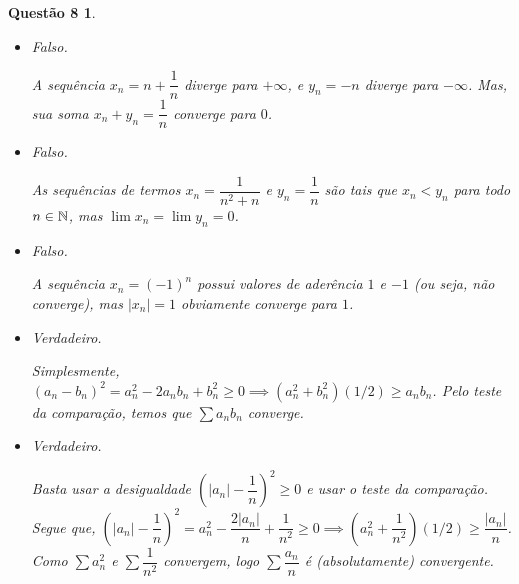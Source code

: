 \documentclass[a4paper,12pt]{article}
\newtheorem*{8}{Questão 8}
\begin{document}
\begin{8}
\begin{itemize}
		\begin{proof}
			
			O caso $P$ infinito é óbvio. Vejamos o caso $P$ finito: Tome $t = \text{máx}P$. Temos que $x_n$ não é destacado, para todo $n > t$. Portanto, se $n_1 > t$ então existe $n_2 > n_1$ tal que $x_{n_1} < x_{n_2}$. Novamente, por ser $n_2 > t$, existe $n_3 > n_2$ tal que $x_{n_2} < x_{n_3}$. Assim sucessivamente, podemos obter um subconjunto infinito $N' = \{n_1 < n_2 < n_3 < ...\}$ dos naturais com $x_{n_1} < x_{n_2} < x_{n_3} < ...$, isto é, uma subsequência crescente de $(x_n)$.
			
			Dada uma sequência $(x_n)$, $P$ pode ser finito ou infinito. Em qualquer caso, temos a existência de uma subsequência monótona.
			
		\end{proof}
		
		\item Falso.
		
		A sequência $x_n = n + \dfrac{1}{n}$ diverge para $+\infty$, e $y_n = -n$ diverge para $-\infty$. Mas, sua soma $x_n + y_n = \dfrac{1}{n}$ converge para $0$.
		
		\item Falso.
		
		As sequências de termos $x_n = \dfrac{1}{n^2 + n}$ e $y_n = \dfrac{1}{n}$ são tais que $x_n < y_n$ para todo $n \in \Bbb N$, mas $\lim x_n = \lim y_n = 0$.
		
		\item Falso.
		
		A sequência $x_n = (-1)^n$ possui valores de aderência $1$ e $-1$ (ou seja, não converge), mas $|x_n| = 1$ obviamente converge para $1$. 
		
		\item Verdadeiro.
		
		Simplesmente, $(a_n - b_n)^2 = a_n^2 - 2a_nb_n + b_n^2 \geq 0 \implies (a_n^2 + b_n^2)(1/2) \geq a_nb_n$. Pelo teste da comparação, temos que $\sum a_nb_n$ converge.
		
		\item Verdadeiro.
		
		Basta usar a desigualdade $(|a_n| - \dfrac{1}{n})^2 \geq 0$ e usar o teste da comparação. Segue que, $(|a_n| - \dfrac{1}{n})^2 = a_n^2 - \dfrac{2|a_n|}{n} + \dfrac{1}{n^2} \geq 0 \implies (a_n^2 + \dfrac{1}{n^2})(1/2) \geq \dfrac{|a_n|}{n}$. Como $\sum a_n^2$ e $\sum \dfrac{1}{n^2}$ convergem, logo $\sum \dfrac{a_n}{n}$ é (absolutamente) convergente.
		
		
	\end{itemize}
	
\end{8}
\end{document}
